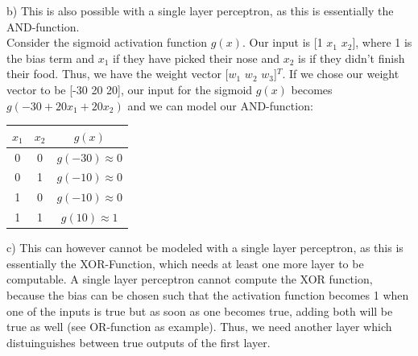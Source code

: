 \documentclass{article}
\begin{document}
b) This is also possible with a single layer perceptron, as this is essentially the AND-function.\\
Consider the sigmoid activation function $g(x)$. Our input is [1 $x_1$ $x_2$], where 1 is the bias term and $x_1$ if they have picked their nose and $x_2$ is if they didn't finish their food. Thus, we have the weight vector [$w_1$ $w_2$ $w_3$]$^T$. If we chose our weight vector to be [-30 20 20], our input for the sigmoid $g(x)$ becomes $g(-30 + 20 x_1 + 20 x_2)$ and we can model our AND-function:
\begin{center}
  \begin{tabular}{ c | c | c }
   $x_1$ & $x_2$ & $g(x)$ \\ \hline
    0 & 0 & $g(-30) \approx 0$ \\
    0 & 1 & $g(-10) \approx 0$ \\
    1 & 0 & $g(-10) \approx 0$ \\
    1 & 1 & $g(10) \approx 1$
  \end{tabular}
\end{center}

c) This can however cannot be modeled with a single layer perceptron, as this is essentially the XOR-Function, which needs at least one more layer to be computable. A single layer perceptron cannot compute the XOR function, because the bias can be chosen such that the activation function becomes 1 when one of the inputs is true but as soon as one becomes true, adding both will be true as well (see OR-function as example). Thus, we need another layer which distuinguishes between true outputs of the first layer.
\end{document}

